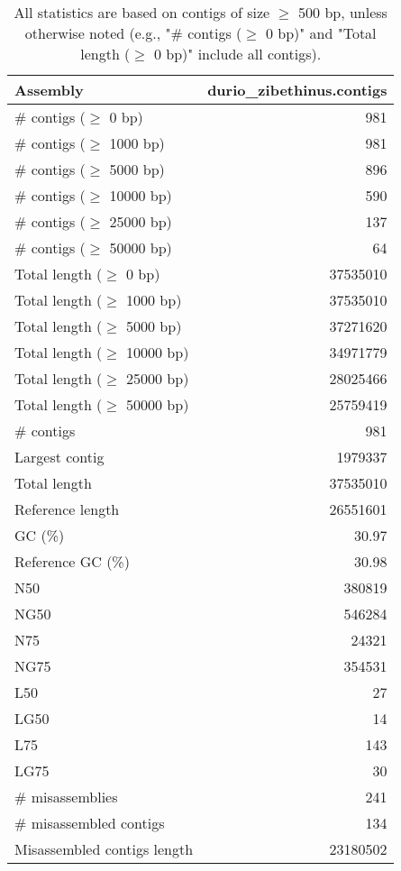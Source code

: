 \documentclass[12pt,a4paper]{article}
\begin{document}
\begin{table}[ht]
\begin{center}
\caption{All statistics are based on contigs of size $\geq$ 500 bp, unless otherwise noted (e.g., "\# contigs ($\geq$ 0 bp)" and "Total length ($\geq$ 0 bp)" include all contigs).}
\begin{tabular}{|l*{1}{|r}|}
\hline
Assembly & durio\_zibethinus.contigs \\ \hline
\# contigs ($\geq$ 0 bp) & 981 \\ \hline
\# contigs ($\geq$ 1000 bp) & 981 \\ \hline
\# contigs ($\geq$ 5000 bp) & 896 \\ \hline
\# contigs ($\geq$ 10000 bp) & 590 \\ \hline
\# contigs ($\geq$ 25000 bp) & 137 \\ \hline
\# contigs ($\geq$ 50000 bp) & 64 \\ \hline
Total length ($\geq$ 0 bp) & 37535010 \\ \hline
Total length ($\geq$ 1000 bp) & 37535010 \\ \hline
Total length ($\geq$ 5000 bp) & 37271620 \\ \hline
Total length ($\geq$ 10000 bp) & 34971779 \\ \hline
Total length ($\geq$ 25000 bp) & 28025466 \\ \hline
Total length ($\geq$ 50000 bp) & 25759419 \\ \hline
\# contigs & 981 \\ \hline
Largest contig & 1979337 \\ \hline
Total length & 37535010 \\ \hline
Reference length & 26551601 \\ \hline
GC (\%) & 30.97 \\ \hline
Reference GC (\%) & 30.98 \\ \hline
N50 & 380819 \\ \hline
NG50 & 546284 \\ \hline
N75 & 24321 \\ \hline
NG75 & 354531 \\ \hline
L50 & 27 \\ \hline
LG50 & 14 \\ \hline
L75 & 143 \\ \hline
LG75 & 30 \\ \hline
\# misassemblies & 241 \\ \hline
\# misassembled contigs & 134 \\ \hline
Misassembled contigs length & 23180502 \\ \hline

\end{tabular}
\end{center}
\end{table}
\end{document}
